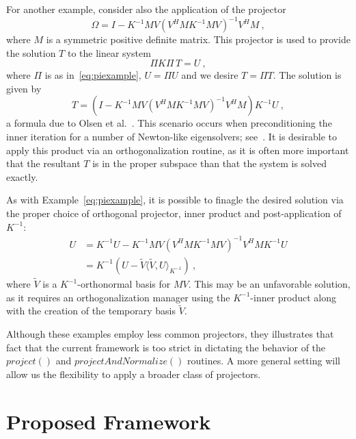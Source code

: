 \documentclass[12pt,letterpaper]{SANDreport}
\theoremstyle{example}
\newcommand{\inner}[2]{\langle #1,#2 \rangle}
\begin{document}
For another example, consider also the application of the projector 
\begin{equation}
  \Omega = I - K^{-1} M V (V^H M K^{-1} M V)^{-1} V^H M\ ,
  \label{eq:omexample}
\end{equation}
where $M$ is a symmetric positive definite matrix. This projector is used to provide the
solution $T$ to the linear system 
\[
   \Pi K \Pi \, T = U\ ,
\]
where $\Pi$ is as in~\eqref{eq:piexample}, $U = \Pi U$ and we desire $T = \Pi T$. The
solution is given by 
\[
T = (I - K^{-1} M V (V^H M K^{-1} M V)^{-1} V^H M) K^{-1} U\ ,
\]
a formula due to Olsen et al.~\cite{OJS90}. This scenario occurs when preconditioning the
inner iteration for a number of Newton-like eigensolvers;
see~\cite{SW82,SvdV96,ST2000,ABG2006-JCAM}. It is desirable to apply this product via an
orthogonalization routine, as it is often more important that the resultant $T$ is in the
proper subspace than that the system is solved exactly. 

As with Example~\eqref{eq:piexample}, it is possible to finagle the desired solution via
the proper choice of orthogonal projector, inner product and post-application of $K^{-1}$:
\begin{align*}
  U &= K^{-1} U - K^{-1} M V (V^H M K^{-1} M V)^{-1} V^H M K^{-1} U \\
    &= K^{-1} \left( U - \tilde{V} \inner{\tilde{V}}{U}_{K^{-1}} \right) \ ,
\end{align*}
where $\tilde{V}$ is a $K^{-1}$-orthonormal basis for $M V$. This may be an unfavorable
solution, as it requires an orthogonalization manager using the $K^{-1}$-inner product
along with the creation of the temporary basis $\tilde{V}$.


Although these examples employ less common projectors, they illustrates that fact that the
current framework is too strict in dictating the behavior of the $project()$ and
$projectAndNormalize()$ routines. A more general setting will allow us the flexibility to
apply a broader class of projectors.


\section{Proposed Framework}
\end{document}
